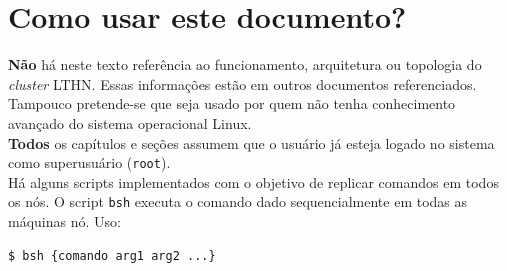 \documentclass[11pt,a4]{report} %
\begin{document}
\setcounter{chapter}{-1}

\chapter{Como usar este documento?}

\textbf{Não} há neste texto referência ao funcionamento, arquitetura
  ou topologia do \textit{cluster} LTHN. Essas informações estão em outros documentos referenciados. Tampouco pretende-se
  que seja usado por quem não tenha conhecimento avançado do sistema operacional Linux.\\
  
  \textbf{Todos} os capítulos e seções assumem que o usuário já esteja logado no sistema como superusuário (\texttt{root}).\\
  Há alguns scripts implementados com o objetivo de replicar comandos em todos os nós. O script \texttt{bsh} executa o comando dado sequencialmente em todas as máquinas nó. Uso:

  \begin{lstlisting}[language=bash,basicstyle=\small]
    $ bsh {comando arg1 arg2 ...}
  \end{lstlisting}

  
  
  
  
  
  

\end{document}
